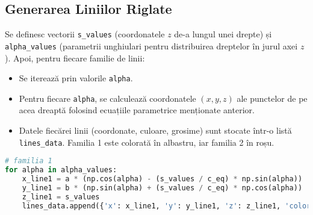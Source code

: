 \documentclass[a4paper,11pt]{article}
\begin{document}
\subsection{Generarea Liniilor Riglate}
Se definesc vectorii \texttt{s\_values} (coordonatele $z$ de-a lungul unei drepte) și \texttt{alpha\_values} (parametrii unghiulari pentru distribuirea dreptelor în jurul axei $z$).
Apoi, pentru fiecare familie de linii:
\begin{itemize}
    \item Se iterează prin valorile \texttt{alpha}.
    \item Pentru fiecare \texttt{alpha}, se calculează coordonatele $(x, y, z)$ ale punctelor de pe acea dreaptă folosind ecuațiile parametrice menționate anterior.
    \item Datele fiecărei linii (coordonate, culoare, grosime) sunt stocate într-o listă \texttt{lines\_data}. Familia 1 este colorată în albastru, iar familia 2 în roșu.
\end{itemize}
\begin{lstlisting}[language=Python, firstnumber=26, caption=Generarea datelor pentru o familie de linii]
# familia 1
for alpha in alpha_values:
    x_line1 = a * (np.cos(alpha) - (s_values / c_eq) * np.sin(alpha))
    y_line1 = b * (np.sin(alpha) + (s_values / c_eq) * np.cos(alpha))
    z_line1 = s_values
    lines_data.append({'x': x_line1, 'y': y_line1, 'z': z_line1, 'color': 'blue', 'linewidth': 1.2})
\end{lstlisting}
\end{document}
